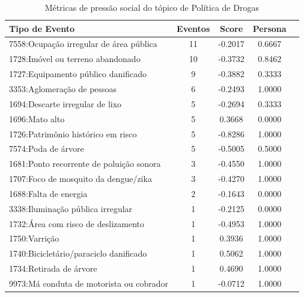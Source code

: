 \begin{table}[htbp]
	\centering
	\caption{Métricas de pressão social do tópico de Política de Drogas}
	\label{tab:eventos_populares_drugs}
	\begin{tabular}{|l|c|c|c|c|}
		\hline
		\textbf{Tipo de Evento}                  & \textbf{Eventos} & \textbf{Score} & \textbf{Persona} \\
		\hline
		7558:Ocupação irregular de área pública  & 11               & -0.2017        & 0.6667           \\
		\hline
		1728:Imóvel ou terreno abandonado        & 10               & -0.3732        & 0.8462           \\
		\hline
		1727:Equipamento público danificado      & 9                & -0.3882        & 0.3333           \\
		\hline
		3353:Aglomeração de pessoas              & 6                & -0.2493        & 1.0000           \\
		\hline
		1694:Descarte irregular de lixo          & 5                & -0.2694        & 0.3333           \\
		\hline
		1696:Mato alto                           & 5                & 0.3668         & 0.0000           \\
		\hline
		1726:Patrimônio histórico em risco       & 5                & -0.8286        & 1.0000           \\
		\hline
		7574:Poda de árvore                      & 5                & -0.5005        & 0.5000           \\
		\hline
		1681:Ponto recorrente de poluição sonora & 3                & -0.4550        & 1.0000           \\
		\hline
		1707:Foco de mosquito da dengue/zika     & 3                & -0.4270        & 1.0000           \\
		\hline
		1688:Falta de energia                    & 2                & -0.1643        & 0.0000           \\
		\hline
		3338:Iluminação pública irregular        & 1                & -0.2125        & 0.0000           \\
		\hline
		1732:Área com risco de deslizamento      & 1                & -0.4953        & 1.0000           \\
		\hline
		1750:Varrição                            & 1                & 0.3936         & 1.0000           \\
		\hline
		1740:Bicicletário/paraciclo danificado   & 1                & 0.5062         & 1.0000           \\
		\hline
		1734:Retirada de árvore                  & 1                & 0.4690         & 1.0000           \\
		\hline
		9973:Má conduta de motorista ou cobrador & 1                & -0.0712        & 1.0000           \\
		\hline
	\end{tabular}
\end{table}

